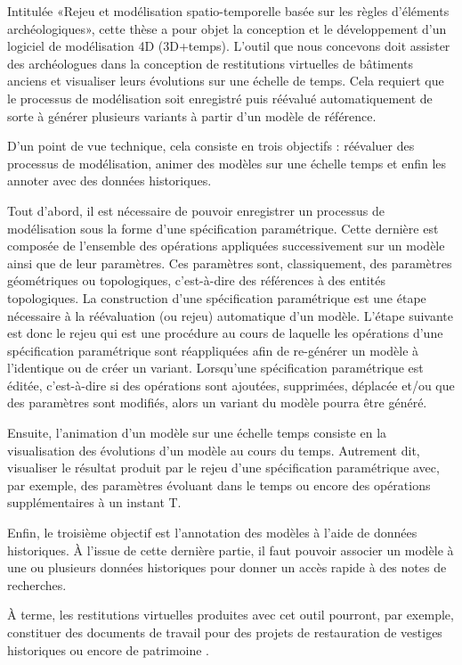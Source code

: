 Intitulée «Rejeu et modélisation spatio-temporelle basée sur les règles
d'éléments archéologiques», cette thèse a pour objet la conception et le
développement d'un logiciel de modélisation 4D (3D+temps). %
L'outil que nous concevons doit assister des archéologues dans la conception de
restitutions virtuelles de bâtiments anciens et visualiser leurs évolutions sur
une échelle de temps. %
Cela requiert que le processus de modélisation soit enregistré puis réévalué
automatiquement de sorte à générer plusieurs variants à partir d'un modèle de
référence. %

D'un point de vue technique, cela consiste en trois objectifs : réévaluer des
processus de modélisation, animer des modèles sur une échelle temps et enfin les
annoter avec des données historiques. %

Tout d'abord, il est nécessaire de pouvoir enregistrer un processus de
modélisation sous la forme d'une spécification paramétrique. %
Cette dernière est composée de l'ensemble des opérations appliquées
successivement sur un modèle ainsi que de leur paramètres. %
Ces paramètres sont, classiquement, des paramètres géométriques ou topologiques,
c'est-à-dire des références à des entités topologiques. %
La construction d'une spécification paramétrique est une étape nécessaire à la
réévaluation (ou rejeu) automatique d'un modèle. %
L'étape suivante est donc le rejeu qui est une procédure au cours de laquelle
les opérations d'une spécification paramétrique sont réappliquées afin de
re-générer un modèle à l'identique ou de créer un variant. %
Lorsqu'une spécification paramétrique est éditée, c'est-à-dire si des opérations
sont ajoutées, supprimées, déplacée et/ou que des paramètres sont modifiés,
alors un variant du modèle pourra être généré. %

Ensuite, l'animation d'un modèle sur une échelle temps consiste en la
visualisation des évolutions d'un modèle au cours du temps. %
Autrement dit, visualiser le résultat produit par le rejeu d'une spécification
paramétrique avec, par exemple, des paramètres évoluant dans le temps ou encore
des opérations supplémentaires à un instant T. %

Enfin, le troisième objectif est l'annotation des modèles à l'aide de données
historiques. %
À l'issue de cette dernière partie, il faut pouvoir associer un modèle à une ou
plusieurs données historiques pour donner un accès rapide à des notes de
recherches. %

À terme, les restitutions virtuelles produites avec cet outil pourront, par
exemple, constituer des documents de travail pour des projets de restauration de
vestiges historiques ou encore de patrimoine \cite{haegler2009procedural}. %



